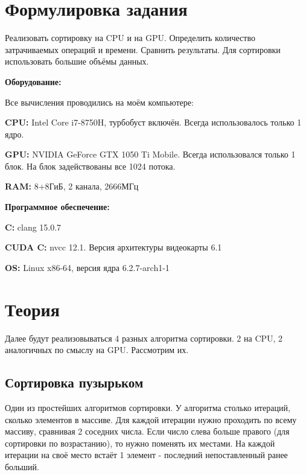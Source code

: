 \documentclass[a4paper,article]{article}
\begin{document}
    \newpage

    \setcounter{page}{2}

    \tableofcontents

    \newpage

    \section{Формулировка задания}

    Реализовать сортировку на CPU и на GPU. Определить количество затрачиваемых операций и времени. Сравнить результаты. Для сортировки использовать большие объёмы данных.
    \newline

    \textbf{Оборудование:}

    Все вычисления проводились на моём компьютере:

    \textbf{CPU:} Intel Core i7-8750H, турбобуст включён. Всегда использовалось только 1 ядро.

    \textbf{GPU:} NVIDIA GeForce GTX 1050 Ti Mobile. Всегда использовался только 1 блок. На блок задействованы все 1024 потока.

    \textbf{RAM:} 8+8ГиБ, 2 канала, 2666МГц
    \newline

    \textbf{Программное обеспечение:}

    \textbf{C:} clang 15.0.7

    \textbf{CUDA C:} nvcc 12.1. Версия архитектуры видеокарты 6.1

    \textbf{OS:} Linux x86-64, версия ядра 6.2.7-arch1-1

    \newpage

    \section{Теория}

    Далее будут реализовываться 4 разных алгоритма сортировки. 2 на CPU, 2 аналогичных по смыслу на GPU. Рассмотрим их.

    \subsection{Сортировка пузырьком}

    Один из простейших алгоритмов сортировки. У алгоритма столько итераций, сколько элементов в массиве. Для каждой итерации нужно проходить по всему массиву, сравнивая 2 соседних числа. Если число слева больше правого (для сортировки по возрастанию), то нужно поменять их местами. На каждой итерации на своё место встаёт 1 элемент - последний непоставленный ранее больший.
\end{document}
